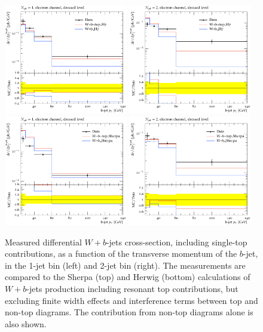 \documentclass[11pt]{cernrep}
\begin{document}
\begin{figure}
\centering
	\includegraphics[width=0.48\textwidth]{unsubtracted-h7-1jet.pdf}
	\includegraphics[width=0.48\textwidth]{unsubtracted-h7-2jet.pdf}
	\includegraphics[width=0.48\textwidth]{unsubtracted-s22-1jet.pdf}
	\includegraphics[width=0.48\textwidth]{unsubtracted-s22-2jet.pdf}
\caption{\label{fig:unsubtracted}
  Measured differential $W+b$-jets cross-section, including single-top contributions, as a function of the
  transverse momentum of the $b$-jet, in the 1-jet bin (left) and 2-jet bin (right).
  The measurements are compared to the Sherpa (top) and Herwig (bottom)
  calculations of $W+b$-jets production including resonant top contributions, but excluding finite width effects
  and interference terms between top and non-top diagrams. The contribution from non-top diagrams alone is
  also shown.}
\end{figure}
\end{document}
